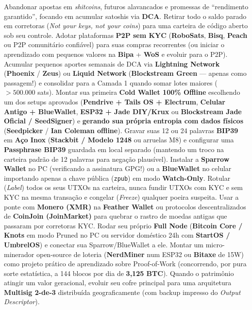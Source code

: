 \documentclass{pousadaguide}
\begin{document}
\begin{checklist}
  \feito Abandonar apostas em \emph{shitcoins}, futuros alavancados e promessas de ``rendimento garantido'', focando em acumular satoshis via \textbf{DCA}.
  \feito Retirar todo o saldo parado em corretoras (\emph{Not your keys, not your coins}) para uma carteira de código aberto sob seu controle.
  \feito Adotar plataformas \textbf{P2P sem KYC} (\textbf{RoboSats}, \textbf{Bisq}, \textbf{Peach} ou P2P comunitário confiável) para suas compras recorrentes (ou iniciar o aprendizado com pequenos valores na \textbf{Bipa} + \textbf{WoS} e evoluir para o P2P).
  \feito Acumular pequenos aportes semanais de DCA via \textbf{Lightning Network} (\textbf{Phoenix} / \textbf{Zeus}) ou \textbf{Liquid Network} (\textbf{Blockstream Green} — apenas como passagem!) e consolidar para a Camada 1 quando somar lotes maiores ($>500.000$ sats).
  \feito Montar sua primeira \textbf{Cold Wallet 100\% Offline} escolhendo um dos setups aprovados (\textbf{Pendrive + Tails OS + Electrum}, \textbf{Celular Antigo + BlueWallet}, \textbf{ESP32 + Jade DIY/Krux} ou \textbf{Blockstream Jade Oficial / SeedSigner}) e \textbf{gerando sua própria entropia com dados físicos} (\textbf{Seedpicker} / \textbf{Ian Coleman offline}).
  \feito Gravar suas 12 ou 24 palavras \textbf{BIP39} em \textbf{Aço Inox} (\textbf{Stackbit / Modelo 1248} ou arruelas M8) e configurar uma \textbf{Passphrase BIP39} guardada em local separado (mantendo um troco na carteira padrão de 12 palavras para negação plausível).
  \feito Instalar a \textbf{Sparrow Wallet} no PC (verificando a assinatura GPG!) ou a \textbf{BlueWallet} no celular importando apenas a chave pública (\texttt{zpub}) em modo \textbf{Watch-Only}.
  \feito Rotular (\emph{Label}) todos os seus UTXOs na carteira, nunca fundir UTXOs com KYC e sem KYC na mesma transação e congelar (\emph{Freeze}) qualquer poeira suspeita.
  \opcional Usar a ponte com \textbf{Monero (XMR)} na \textbf{Feather Wallet} ou protocolos descentralizados de \textbf{CoinJoin (\textbf{JoinMarket})} para quebrar o rastro de moedas antigas que passaram por corretoras KYC.
  \opcional Rodar seu próprio \textbf{Full Node} (\textbf{Bitcoin Core / Knots} em modo Pruned no PC ou servidor doméstico 24h com \textbf{StartOS / UmbrelOS}) e conectar sua Sparrow/BlueWallet a ele.
  \opcional Montar um micro-minerador open-source de loteria (\textbf{NerdMiner} num ESP32 ou \textbf{Bitaxe} de 15W) como projeto prático de aprendizado sobre Proof-of-Work (concorrendo, por pura sorte estatística, a 144 blocos por dia de \textbf{3,125 BTC}).
  \opcional Quando o patrimônio atingir um valor geracional, evoluir seu cofre principal para uma arquitetura \textbf{Multisig 2-de-3} distribuída geograficamente (com backup impresso do \emph{Output Descriptor}).
\end{checklist}
\end{document}
